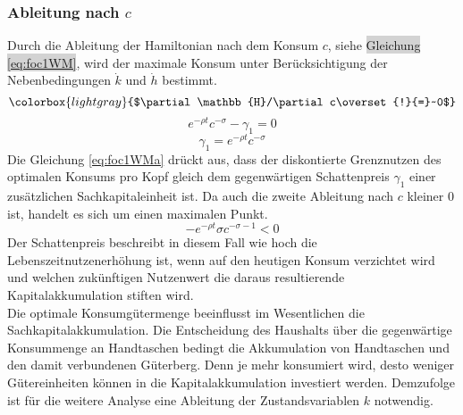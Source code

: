 \subsubsection*{Ableitung nach $c$}
Durch die Ableitung der Hamiltonian nach dem Konsum $c$, siehe \colorbox{lightgray}{Gleichung \eqref{eq:foc1WM}}, wird der maximale Konsum unter Ber{\"u}cksichtigung der Nebenbedingungen $\dot{k}$ und $\dot{h}$ bestimmt.
\begin{equation}
\colorbox{lightgray}{$\partial\mathbb{H}/\partial c\overset{!}{=}~0$}
\end{equation}
\vspace{-0.5cm}
\begin{equation}
e^{-\rho t}c^{-\sigma}-\gamma_1 = 0
\end{equation}
\vspace{-0.7cm}
\begin{equation}
\gamma_1=e^{-\rho t}c^{-\sigma}
\label{eq:foc1WMa}
\end{equation}
Die Gleichung \eqref{eq:foc1WMa} dr{\"u}ckt aus, dass der diskontierte Grenznutzen des optimalen Konsums pro Kopf gleich dem gegenwärtigen Schattenpreis $\gamma_1$ einer zusätzlichen Sachkapitaleinheit ist. Da auch die zweite Ableitung nach $c$ kleiner $0$ ist, handelt es sich um einen maximalen Punkt. 
\begin{equation}
-e^{-\rho t}\sigma c^{-\sigma-1}<0
\end{equation}
Der Schattenpreis beschreibt in diesem Fall wie hoch die Lebenszeitnutzenerhöhung ist, wenn auf den heutigen Konsum verzichtet wird und welchen zukünftigen Nutzenwert die  daraus resultierende Kapitalakkumulation stiften wird.\\
Die optimale Konsumgütermenge beeinflusst im Wesentlichen die Sachkapitalakkumulation. Die Entscheidung des Haushalts über die gegenwärtige Konsummenge an Handtaschen bedingt die Akkumulation von Handtaschen und den damit verbundenen Güterberg. Denn je mehr konsumiert wird, desto weniger Gütereinheiten können in die Kapitalakkumulation investiert werden. Demzufolge ist für die weitere Analyse eine Ableitung der Zustandsvariablen $k$ notwendig.
 
